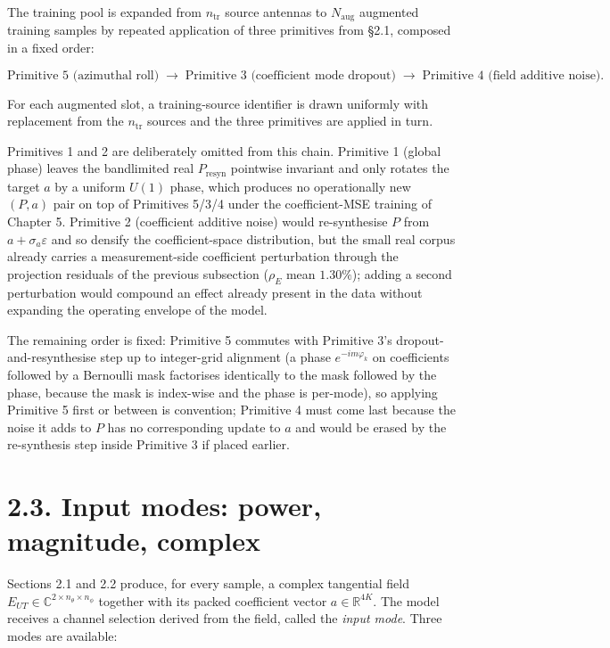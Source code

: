 \documentclass[
  english,
  11pt,
]{report}
\begin{document}
The training pool is expanded from \(n_\mathrm{tr}\) source antennas to
\(N_\mathrm{aug}\) augmented training samples by repeated application of
three primitives from §2.1, composed in a fixed order:

\[
\text{Primitive 5 (azimuthal roll)}\;\to\;\text{Primitive 3 (coefficient mode dropout)}\;\to\;\text{Primitive 4 (field additive noise)}.
\]

For each augmented slot, a training-source identifier is drawn uniformly
with replacement from the \(n_\mathrm{tr}\) sources and the three
primitives are applied in turn.

Primitives 1 and 2 are deliberately omitted from this chain. Primitive 1
(global phase) leaves the bandlimited real \(P_\mathrm{resyn}\)
pointwise invariant and only rotates the target \(a\) by a uniform
\(U(1)\) phase, which produces no operationally new \((P, a)\) pair on
top of Primitives 5/3/4 under the coefficient-MSE training of Chapter 5.
Primitive 2 (coefficient additive noise) would re-synthesise \(P\) from
\(a + \sigma_a\varepsilon\) and so densify the coefficient-space
distribution, but the small real corpus already carries a
measurement-side coefficient perturbation through the projection
residuals of the previous subsection (\(\rho_E\) mean \(1.30\%\));
adding a second perturbation would compound an effect already present in
the data without expanding the operating envelope of the model.

The remaining order is fixed: Primitive 5 commutes with Primitive 3's
dropout-and-resynthesise step up to integer-grid alignment (a phase
\(e^{-im\varphi_k}\) on coefficients followed by a Bernoulli mask
factorises identically to the mask followed by the phase, because the
mask is index-wise and the phase is per-mode), so applying Primitive 5
first or between is convention; Primitive 4 must come last because the
noise it adds to \(P\) has no corresponding update to \(a\) and would be
erased by the re-synthesis step inside Primitive 3 if placed earlier.

\section{2.3. Input modes: power, magnitude,
complex}\label{input-modes-power-magnitude-complex}

Sections 2.1 and 2.2 produce, for every sample, a complex tangential
field \(E_{UT} \in \mathbb{C}^{2 \times n_\theta \times n_\phi}\)
together with its packed coefficient vector \(a \in \mathbb{R}^{4K}\).
The model receives a channel selection derived from the field, called
the \emph{input mode}. Three modes are available:
\end{document}
